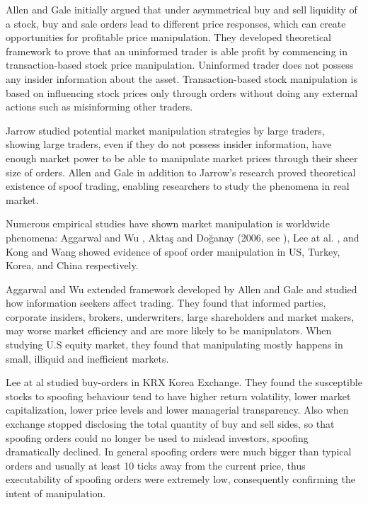 \documentclass{tut-thesis}
\begin{document}
Allen and Gale \parencite*{AllenGale1992} initially argued that under asymmetrical buy and sell liquidity of a stock, buy and sale orders lead to different price responses, which can create opportunities for profitable price manipulation. They developed theoretical framework to prove that an uninformed trader is able profit by commencing in transaction-based stock price manipulation. Uninformed trader does not possess any insider information about the asset. Transaction-based stock manipulation is based on influencing stock prices only through orders without doing any external actions such as misinforming other traders.

Jarrow \parencite*{Jarrow1992} studied potential market manipulation strategies by large traders, showing large traders, even if they do not possess insider information, have enough market power to be able to manipulate market prices through their sheer size of orders. Allen and Gale in addition to Jarrow's research proved theoretical existence of spoof trading, enabling researchers to study the phenomena in real market.

Numerous empirical studies have shown market manipulation is worldwide phenomena: Aggarwal and Wu \parencite*{AggarwalWu2006}, Aktaş and Doğanay (2006, see \cite{OgutDoganayAktas2009}), Lee at al. \parencite*{LeeEomPark2009}, and Kong and Wang \parencite*{KongWang2014} showed evidence of spoof order manipulation in US, Turkey, Korea, and China respectively.

Aggarwal and Wu \parencite*{AggarwalWu2006} extended framework developed by Allen and Gale and studied how information seekers affect trading. They found that informed parties, corporate insiders, brokers, underwriters, large shareholders and market makers, may worse market efficiency and are more likely to be manipulators. When studying U.S equity market, they found that manipulating mostly happens in small, illiquid and inefficient markets.

Lee at al \parencite*{LeeEomPark2009} studied buy-orders in KRX Korea Exchange. They found the susceptible stocks to spoofing behaviour tend to have higher return volatility, lower market capitalization, lower price levels and lower managerial transparency. Also when exchange stopped disclosing the total quantity of buy and sell sides, so that spoofing orders could no longer be used to mislead investors, spoofing dramatically declined. In general spoofing orders were much bigger than typical orders and usually at least 10 ticks away from the current price, thus executability of spoofing orders were extremely low, consequently confirming the intent of manipulation. \autocite{LeeEomPark2009}
\end{document}
